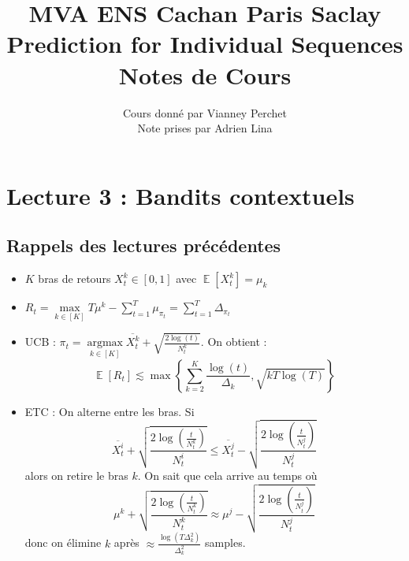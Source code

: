 \documentclass{article}
\DeclareMathOperator*{\argmax}{argmax}
\DeclareMathOperator*{\E}{\mathbb{E}}
\theoremstyle{remark}
\theoremstyle{remark}
\begin{document}
\title{%
  \large MVA ENS Cachan Paris Saclay \\
  \huge Prediction for Individual Sequences\\ Notes de Cours \\
}
\author{%
  Cours donné par Vianney Perchet \\
  Note prises par Adrien Lina
}

\maketitle

\section{Lecture 3 : Bandits contextuels}

\subsection{Rappels des lectures précédentes}

\begin{itemize}
   \item $K$ bras de retours $X_t^k \in [0,1]$ avec $\E[X_t^k] = \mu_k$
   \item $R_t = \max\limits_{k \in [K]} T \mu^k - \sum_{t=1}^T \mu_{\pi_t} = \sum_{t=1}^T \Delta_{\pi_t}$
   \item UCB : $\pi_t = \argmax\limits_{k \in [K]} \overline{X_t^k} + \sqrt{\frac{2 \log(t)}{N_t^k}}$. On obtient :
   $$
   \E[R_t] \lesssim \max\left\{ \sum_{k=2}^K \frac{\log(t)}{\Delta_k}, \sqrt{k T \log(T)} \right\}
   $$
   \item ETC : On alterne entre les bras. Si
   $$
   \overline{X_t^i} + \sqrt{\frac{2 \log(\frac{t}{N_t^k})}{N_t^i}} \leq \overline{X_t^j} - \sqrt{\frac{2 \log(\frac{t}{N_t^j})}{N_t^j}}
   $$
   alors on retire le bras $k$. On sait que cela arrive au temps où
   $$
   \mu^k + \sqrt{\frac{2 \log(\frac{t}{N_t^k})}{N_t^k}} \approx \mu^j - \sqrt{\frac{2 \log(\frac{t}{N_t^j})}{N_t^j}}
   $$
   donc on élimine $k$ après $\approx \frac{\log(T \Delta_k^2)}{\Delta_k^2}$ samples.
\end{itemize}
\end{document}
